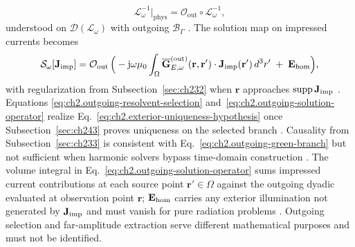 \begin{equation}
\label{eq:ch2.outgoing-resolvent-selection}
\mathcal{L}_\omega^{-1}\big|_{\mathrm{phys}}
=
\mathcal{O}_{\mathrm{out}}\circ\mathcal{L}_\omega^{-1},
\end{equation}
understood on \(\mathcal{D}(\mathcal{L}_\omega)\) with outgoing \(\mathcal{B}_\Gamma\)
\cite{stratton1941}. The solution map on impressed currents becomes
\begin{equation}
\label{eq:ch2.outgoing-solution-operator}
\mathcal{S}_\omega[\mathbf{J}_{\mathrm{imp}}]
=
\mathcal{O}_{\mathrm{out}}\,
\Big(-\mathrm{j}\omega\mu_0\int_{\Omega}
\overline{\mathbf{G}}_{E,\omega}^{\mathrm{(out)}}(\mathbf{r},\mathbf{r}')\cdot\mathbf{J}_{\mathrm{imp}}(\mathbf{r}')\,d^{3}r'
\;+\;\mathbf{E}_{\mathrm{hom}}\Big),
\end{equation}
with regularization from Subsection~\ref{sec:ch232} when \(\mathbf{r}\) approaches
\(\operatorname{supp}\mathbf{J}_{\mathrm{imp}}\) \cite{harrington2001}. Equations
\eqref{eq:ch2.outgoing-resolvent-selection} and~\eqref{eq:ch2.outgoing-solution-operator}
realize Eq.~\eqref{eq:ch2.exterior-uniqueness-hypothesis} once
Subsection~\ref{sec:ch243} proves uniqueness on the selected branch
\cite{stratton1941}. Causality from Subsection~\ref{sec:ch233} is consistent with
Eq.~\eqref{eq:ch2.outgoing-green-branch} but not sufficient when harmonic solvers
bypass time-domain construction \cite{harrington2001}. The volume integral in
Eq.~\eqref{eq:ch2.outgoing-solution-operator} sums impressed current contributions at each
source point \(\mathbf{r}'\in\Omega\) against the outgoing dyadic evaluated at observation
point \(\mathbf{r}\); \(\mathbf{E}_{\mathrm{hom}}\) carries any exterior illumination not generated
by \(\mathbf{J}_{\mathrm{imp}}\) and must vanish for pure radiation problems \cite{stratton1941}.
Outgoing selection and far-amplitude extraction serve different mathematical purposes and must not be identified.
